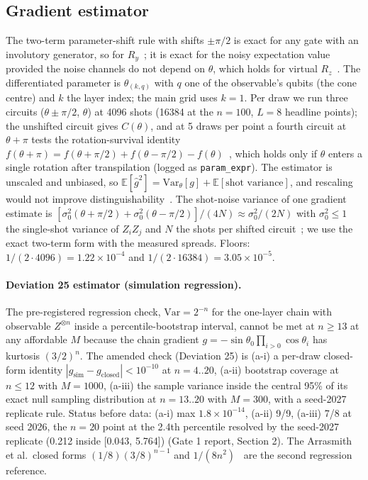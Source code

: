 \documentclass[aps,prxquantum,reprint,superscriptaddress,nofootinbib,longbibliography,amsmath,amssymb]{revtex4-2}
\newcommand{\Var}{\mathrm{Var}}
\begin{document}
\subsection{Gradient estimator}\label{sec:estimator}
The two-term parameter-shift rule with shifts $\pm\pi/2$ is exact for any gate with an involutory generator, so for $R_y$~\cite{Mari2021}; it is exact for the noisy expectation value provided the noise channels do not depend on $\theta$, which holds for virtual $R_z$~\cite{Banchi2026}. The differentiated parameter is $\theta_{(k,q)}$ with $q$ one of the observable's qubits (the cone centre) and $k$ the layer index; the main grid uses $k = 1$. Per draw we run three circuits ($\theta \pm \pi/2$, $\theta$) at 4096 shots (16384 at the $n = 100$, $L = 8$ headline points); the unshifted circuit gives $C(\theta)$, and at 5 draws per point a fourth circuit at $\theta + \pi$ tests the rotation-survival identity $f(\theta+\pi) = f(\theta+\pi/2) + f(\theta-\pi/2) - f(\theta)$~\cite{Mari2021}, which holds only if $\theta$ enters a single rotation after transpilation (logged as \texttt{param\_expr}). The estimator is unscaled and unbiased, so $\mathbb{E}[\hat g^2] = \Var_\theta[g] + \mathbb{E}[\text{shot variance}]$, and rescaling would not improve distinguishability~\cite{AghaeiSaem2026}. The shot-noise variance of one gradient estimate is $[\sigma_0^2(\theta+\pi/2)+\sigma_0^2(\theta-\pi/2)]/(4N) \approx \sigma_0^2/(2N)$ with $\sigma_0^2 \leq 1$ the single-shot variance of $Z_iZ_j$ and $N$ the shots per shifted circuit~\cite{Mari2021}; we use the exact two-term form with the measured spreads. Floors: $1/(2\cdot4096) = 1.22\times10^{-4}$ and $1/(2\cdot16384) = 3.05\times10^{-5}$.

\paragraph{Deviation 25 estimator (simulation regression).} The pre-registered regression check, $\Var = 2^{-n}$ for the one-layer chain with observable $Z^{\otimes n}$ inside a percentile-bootstrap interval, cannot be met at $n \geq 13$ at any affordable $M$ because the chain gradient $g = -\sin\theta_0\prod_{i>0}\cos\theta_i$ has kurtosis $(3/2)^n$. The amended check (Deviation 25) is (a-i) a per-draw closed-form identity $|g_{\mathrm{sim}} - g_{\mathrm{closed}}| < 10^{-10}$ at $n = 4..20$, (a-ii) bootstrap coverage at $n \leq 12$ with $M = 1000$, (a-iii) the sample variance inside the central 95\% of its exact null sampling distribution at $n = 13..20$ with $M = 300$, with a seed-2027 replicate rule. Status before data: (a-i) max $1.8\times10^{-14}$, (a-ii) 9/9, (a-iii) 7/8 at seed 2026, the $n = 20$ point at the 2.4th percentile resolved by the seed-2027 replicate (0.212 inside [0.043, 5.764]) (Gate 1 report, Section 2). The Arrasmith et al.\ closed forms $(1/8)(3/8)^{n-1}$ and $1/(8n^2)$~\cite{Arrasmith2022} are the second regression reference.
\end{document}
